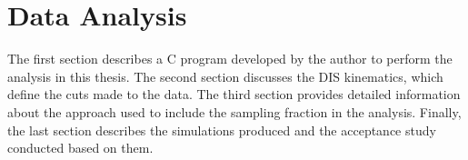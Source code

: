 \section{Data Analysis}
\label{13::data_analysis}
    The first section describes a C program developed by the author to perform the analysis in this thesis.
    The second section discusses the DIS kinematics, which define the cuts made to the data.
    The third section provides detailed information about the approach used to include the sampling fraction in the analysis.
    Finally, the last section describes the simulations produced and the acceptance study conducted based on them.

    
    
    
    
